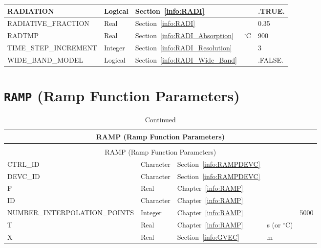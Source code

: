 \documentclass[11pt]{book}
\begin{document}
\begin{longtable}{@{\extracolsep{\fill}}|l|l|l|l|l|}
{\ct RADIATION}                     & Logical       & Section~\ref{info:RADI}                   &                   & {\ct .TRUE.}      \\ \hline
{\ct RADIATIVE\_FRACTION}           & Real          & Section~\ref{info:RADI}                   &                   & 0.35              \\ \hline
{\ct RADTMP                   }     & Real          & Section~\ref{info:RADI_Absorption}        & $^\circ$C         & 900               \\ \hline
{\ct TIME\_STEP\_INCREMENT}         & Integer       & Section~\ref{info:RADI_Resolution}        &                   & 3                 \\ \hline
{\ct WIDE\_BAND\_MODEL    }         & Logical       & Section~\ref{info:RADI_Wide_Band}         &                   & {\ct .FALSE.}     \\ \hline
\end{longtable}

\vspace{\baselineskip}


\section{\texorpdfstring{{\tt RAMP}}{RAMP} (Ramp Function Parameters)}

\begin{longtable}{@{\extracolsep{\fill}}|l|l|l|l|l|}
\caption[Ramp function parameters ({\ct RAMP} namelist group)]{For more information see Chapter~\ref{info:RAMP}.}
\label{tbl:RAMP} \\
\hline
\multicolumn{5}{|c|}{{\ct RAMP} (Ramp Function Parameters)} \\
\hline \hline
\endfirsthead
\caption[]{Continued} \\
\hline
\multicolumn{5}{|c|}{{\ct RAMP} (Ramp Function Parameters)} \\
\hline \hline
\endhead
{\ct CTRL\_ID}                      & Character     & Section~\ref{info:RAMPDEVC}   &                       &           \\ \hline
{\ct DEVC\_ID}                      & Character     & Section~\ref{info:RAMPDEVC}   &                       &           \\ \hline
{\ct F}                             & Real          & Chapter~\ref{info:RAMP}       &                       &           \\ \hline
{\ct ID}                            & Character     & Chapter~\ref{info:RAMP}       &                       &           \\ \hline
{\ct NUMBER\_INTERPOLATION\_POINTS} & Integer       & Chapter~\ref{info:RAMP}       &                       &  5000     \\ \hline
{\ct T}                             & Real          & Chapter~\ref{info:RAMP}       & s (or $^\circ$C)      &           \\ \hline
{\ct X}                             & Real          & Section~\ref{info:GVEC}       & m                     &           \\ \hline
\end{longtable}
\end{document}
